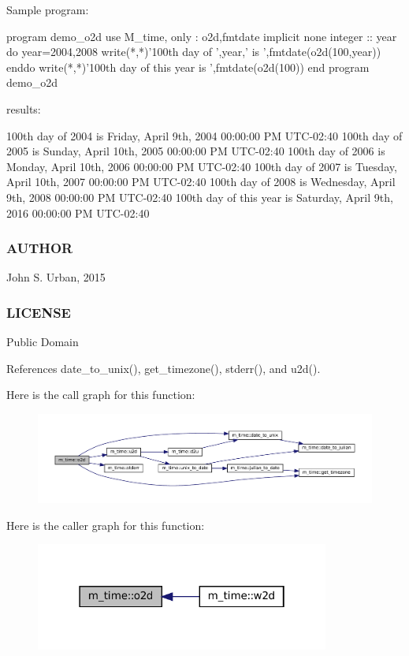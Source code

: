 \begin{DoxyVerb}Sample program:

 program demo_o2d
 use M_time, only : o2d,fmtdate
 implicit none
 integer :: year
    do year=2004,2008
       write(*,*)'100th day of ',year,' is ',fmtdate(o2d(100,year))
    enddo
    write(*,*)'100th day of this year is ',fmtdate(o2d(100))
 end program demo_o2d

results:

 100th day of 2004 is Friday, April 9th, 2004 00:00:00 PM UTC-02:40
 100th day of 2005 is Sunday, April 10th, 2005 00:00:00 PM UTC-02:40
 100th day of 2006 is Monday, April 10th, 2006 00:00:00 PM UTC-02:40
 100th day of 2007 is Tuesday, April 10th, 2007 00:00:00 PM UTC-02:40
 100th day of 2008 is Wednesday, April 9th, 2008 00:00:00 PM UTC-02:40
 100th day of this year is Saturday, April 9th, 2016 00:00:00 PM UTC-02:40
\end{DoxyVerb}
 \subsubsection*{A\+U\+T\+H\+OR}

John S. Urban, 2015 \subsubsection*{L\+I\+C\+E\+N\+SE}

Public Domain 

References date\+\_\+to\+\_\+unix(), get\+\_\+timezone(), stderr(), and u2d().

Here is the call graph for this function\+:\nopagebreak
\begin{figure}[H]
\begin{center}
\leavevmode
\includegraphics[width=350pt]{namespacem__time_a55e2cb9efc9d4d209ae2864f073d4f19_cgraph}
\end{center}
\end{figure}
Here is the caller graph for this function\+:\nopagebreak
\begin{figure}[H]
\begin{center}
\leavevmode
\includegraphics[width=274pt]{namespacem__time_a55e2cb9efc9d4d209ae2864f073d4f19_icgraph}
\end{center}
\end{figure}
\mbox{\label{namespacem__time_a7fb507bb72a1872ec2a86fb7f3a50d75}} 
